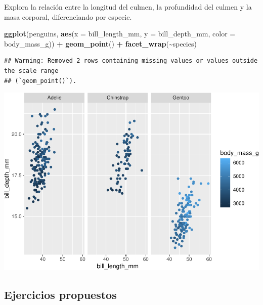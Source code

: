 \documentclass[
]{book}
\newenvironment{Shaded}{\begin{snugshade}}{\end{snugshade}}
\newcommand{\AttributeTok}[1]{\textcolor[rgb]{0.13,0.29,0.53}{#1}}
\newcommand{\FunctionTok}[1]{\textcolor[rgb]{0.13,0.29,0.53}{\textbf{#1}}}
\newcommand{\NormalTok}[1]{#1}
\newcommand{\SpecialCharTok}[1]{\textcolor[rgb]{0.81,0.36,0.00}{\textbf{#1}}}
\begin{document}
Explora la relación entre la longitud del culmen, la profundidad del culmen y la masa corporal, diferenciando por especie.

\begin{Shaded}
\begin{Highlighting}[]
\FunctionTok{ggplot}\NormalTok{(penguins, }\FunctionTok{aes}\NormalTok{(}\AttributeTok{x =}\NormalTok{ bill\_length\_mm, }\AttributeTok{y =}\NormalTok{ bill\_depth\_mm, }\AttributeTok{color =}\NormalTok{ body\_mass\_g)) }\SpecialCharTok{+}
  \FunctionTok{geom\_point}\NormalTok{() }\SpecialCharTok{+}
  \FunctionTok{facet\_wrap}\NormalTok{(}\SpecialCharTok{\textasciitilde{}}\NormalTok{species)}
\end{Highlighting}
\end{Shaded}

\begin{verbatim}
## Warning: Removed 2 rows containing missing values or values outside the scale range
## (`geom_point()`).
\end{verbatim}

\includegraphics{bookdown-demo_files/figure-latex/unnamed-chunk-214-1.pdf}

\hypertarget{ejercicios-propuestos-1}{%
\subsection{Ejercicios propuestos}\label{ejercicios-propuestos-1}}
\end{document}
